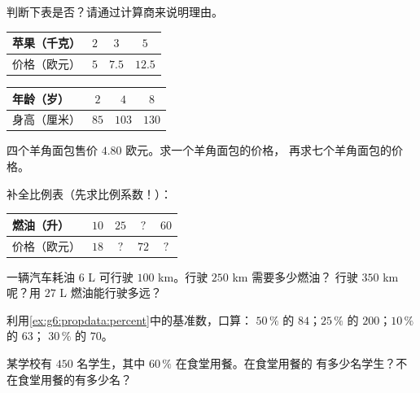 \begin{exercise}[$\star$]\label{exo:g6:propdata:1}
判断下表是否？请通过计算商来说明理由。
\begin{center}
\renewcommand{\arraystretch}{1.2}
\begin{tabular}{l|ccc}
苹果（千克） & $2$ & $3$ & $5$ \\
\hline
价格（欧元） & $5$ & $7.5$ & $12.5$ \\
\end{tabular}
\qquad
\begin{tabular}{l|ccc}
年龄（岁） & $2$ & $4$ & $8$ \\
\hline
身高（厘米） & $85$ & $103$ & $130$ \\
\end{tabular}
\end{center}
\end{exercise}

\begin{exercise}[$\star$]\label{exo:g6:propdata:2}
四个羊角面包售价 $4.80$ 欧元。求一个羊角面包的价格，
再求七个羊角面包的价格。
\end{exercise}

\begin{exercise}[$\star$]\label{exo:g6:propdata:3}
补全比例表（先求比例系数！）：
\begin{center}
\renewcommand{\arraystretch}{1.2}
\begin{tabular}{l|cccc}
燃油（升） & $10$ & $25$ & $?$ & $60$ \\
\hline
价格（欧元） & $18$ & $?$ & $72$ & $?$ \\
\end{tabular}
\end{center}
\end{exercise}

\begin{exercise}[$\star$]\label{exo:g6:propdata:4}
一辆汽车耗油 $6$ L 可行驶 $100$ km。行驶 $250$ km 需要多少燃油？
行驶 $350$ km 呢？用 $27$ L 燃油能行驶多远？
\end{exercise}

\begin{exercise}[$\star$]\label{exo:g6:propdata:5}
利用\cref{ex:g6:propdata:percent}中的基准数，口算：
$50\,\%$ 的 $84$；\quad $25\,\%$ 的 $200$；\quad $10\,\%$ 的 $63$；
\quad $30\,\%$ 的 $70$。
\end{exercise}

\begin{exercise}[$\star$]\label{exo:g6:propdata:6}
某学校有 $450$ 名学生，其中 $60\,\%$ 在食堂用餐。在食堂用餐的
有多少名学生？不在食堂用餐的有多少名？
\end{exercise}

